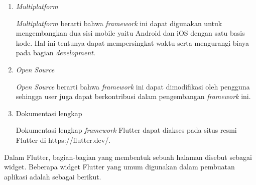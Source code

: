\begin{enumerate}
	\item \textit{Multiplatform}
	
	\textit{Multiplatform} berarti bahwa \textit{framework} ini dapat digunakan untuk mengembangkan dua sisi mobile yaitu Android dan iOS dengan satu basis kode. Hal ini tentunya dapat mempersingkat waktu serta mengurangi biaya pada bagian \textit{development}.

	\item \textit{Open Source}
	
	\textit{Open Source} berarti bahwa \textit{framework} ini dapat dimodifikasi oleh pengguna sehingga user juga dapat berkontribusi dalam pengembangan \textit{framework} ini.

	\item Dokumentasi lengkap
	
	Dokumentasi lengkap \textit{framework} Flutter dapat diakses pada situs resmi Flutter di https://flutter.dev/.
\end{enumerate}

Dalam Flutter, bagian-bagian yang membentuk sebuah halaman disebut sebagai widget. Beberapa widget Flutter yang umum digunakan dalam pembuatan aplikasi adalah sebagai berikut.

